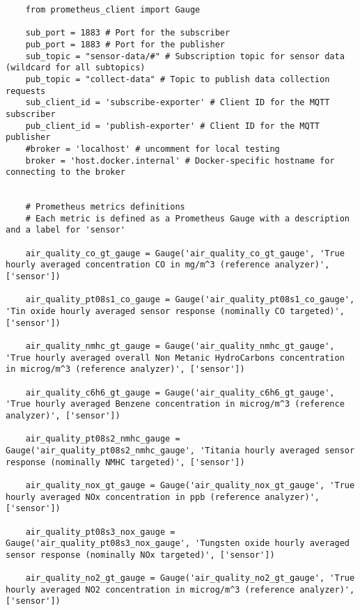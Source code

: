 \begin{verbatim}
    from prometheus_client import Gauge

    sub_port = 1883 # Port for the subscriber
    pub_port = 1883 # Port for the publisher
    sub_topic = "sensor-data/#" # Subscription topic for sensor data (wildcard for all subtopics)
    pub_topic = "collect-data" # Topic to publish data collection requests
    sub_client_id = 'subscribe-exporter' # Client ID for the MQTT subscriber
    pub_client_id = 'publish-exporter' # Client ID for the MQTT publisher
    #broker = 'localhost' # uncomment for local testing
    broker = 'host.docker.internal' # Docker-specific hostname for connecting to the broker


    # Prometheus metrics definitions
    # Each metric is defined as a Prometheus Gauge with a description and a label for 'sensor'

    air_quality_co_gt_gauge = Gauge('air_quality_co_gt_gauge', 'True hourly averaged concentration CO in mg/m^3 (reference analyzer)', ['sensor'])

    air_quality_pt08s1_co_gauge = Gauge('air_quality_pt08s1_co_gauge', 'Tin oxide hourly averaged sensor response (nominally CO targeted)', ['sensor'])

    air_quality_nmhc_gt_gauge = Gauge('air_quality_nmhc_gt_gauge', 'True hourly averaged overall Non Metanic HydroCarbons concentration in microg/m^3 (reference analyzer)', ['sensor'])

    air_quality_c6h6_gt_gauge = Gauge('air_quality_c6h6_gt_gauge', 'True hourly averaged Benzene concentration in microg/m^3 (reference analyzer)', ['sensor'])

    air_quality_pt08s2_nmhc_gauge = Gauge('air_quality_pt08s2_nmhc_gauge', 'Titania hourly averaged sensor response (nominally NMHC targeted)', ['sensor'])

    air_quality_nox_gt_gauge = Gauge('air_quality_nox_gt_gauge', 'True hourly averaged NOx concentration in ppb (reference analyzer)', ['sensor'])

    air_quality_pt08s3_nox_gauge = Gauge('air_quality_pt08s3_nox_gauge', 'Tungsten oxide hourly averaged sensor response (nominally NOx targeted)', ['sensor'])

    air_quality_no2_gt_gauge = Gauge('air_quality_no2_gt_gauge', 'True hourly averaged NO2 concentration in microg/m^3 (reference analyzer)', ['sensor'])


\end{verbatim}
